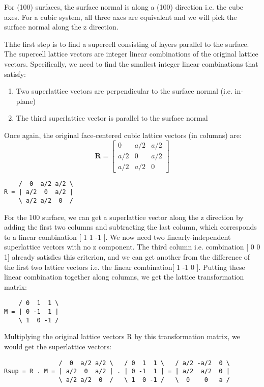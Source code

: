 For (100) surfaces, the surface normal is along a (100) direction i.e. the cube axes.
For a cubic system, all three axes are equivalent and we will pick the surface normal along the z direction.

Thhe first step is to find a supercell consisting of layers parallel to the surface. The supercell
lattice vectors are integer linear combinations of the original lattice vectors.
Specifically, we need to find the smallest integer linear combinations that satisfy:
\begin{enumerate}
\item Two superlattice vectors are perpendicular to the surface normal (i.e. in-plane)
\item The third superlattice vector is parallel to the surface normal
\end{enumerate}

Once again, the original face-centered cubic lattice vectors (in columns) are:
\begin{equation}
\mathbf{R} = \begin{bmatrix}
0 & a/2 & a/2 \\
a/2 & 0 & a/2 \\
a/2 & a/2 & 0
\end{bmatrix}
\end{equation}

\begin{verbatim}
    /  0  a/2 a/2 \
R = | a/2  0  a/2 |
    \ a/2 a/2  0  /
\end{verbatim}

For the 100 surface, we can get a superlattice vector along the z direction by adding the first
two columns and subtracting the last column, which corresponds to a linear combination [ 1 1 -1 ].
We now need two linearly-independent superlattice vectors with no z component.
The third column i.e. combination [ 0 0 1] already satisfies this criterion, and we can
get another from the difference of the first two lattice vectors i.e. the linear combination[ 1 -1 0 ].
Putting these linear combination together along columns, we get the lattice transformation matrix:

\begin{verbatim}
    / 0  1  1 \
M = | 0 -1  1 |
    \ 1  0 -1 /
\end{verbatim}

Multiplying the original lattice vectors R by this transformation matrix, we would get the superlattice vectors:

\begin{verbatim}
               /  0  a/2 a/2 \   / 0  1  1 \   / a/2 -a/2  0 \
Rsup = R . M = | a/2  0  a/2 | . | 0 -1  1 | = | a/2  a/2  0 |
               \ a/2 a/2  0  /   \ 1  0 -1 /   \  0    0   a /
\end{verbatim}


